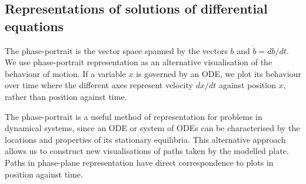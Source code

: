 \documentclass{article}
\begin{document}
\subsection{Representations of solutions of differential equations}

The phase-portrait is the vector space spanned by the vectors $b$ and $\dot{b}=db/dt$.
We use phase-portrait representation as an alternative visualisation of the behaviour of motion. If a variable $x$ is governed by an ODE,
we plot its behaviour over time where the different axes represent velocity $dx/dt$ against position $x$,
rather than position against time.

The phase-portrait is a useful method of representation for problems in dynamical systems,
since an ODE or system of ODEs can be characterised by the locations and properties of its stationary equilibria.
This alternative approach allows us to construct new visualisations of paths taken by the modelled plate.
Paths in phase-plane representation have direct correspondence to plots in position against time.

\end{document}
